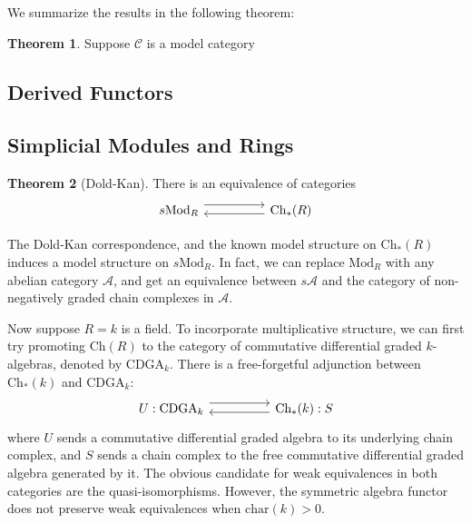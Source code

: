 \documentclass{article}
\theoremstyle{definition}
\newtheorem{theorem}{Theorem}[section]
\theoremstyle{definition}
\theoremstyle{definition}
\theoremstyle{definition}
\theoremstyle{definition}
\theoremstyle{definition}
\theoremstyle{definition}
\begin{document}
We summarize the results in the following theorem:
\begin{theorem}
	Suppose $\mathcal{C}$ is a model category
\end{theorem}

\subsection{Derived Functors}

\subsection{Simplicial Modules and Rings}

\begin{theorem}[Dold-Kan]
	There is an equivalence of categories 
	\[\begin{tikzcd}
		{s\textrm{Mod}_R} && {\textrm{Ch}_*(R)}
		\arrow[shift left=2, from=1-1, to=1-3]
		\arrow[shift left, from=1-3, to=1-1]
	\end{tikzcd}\]
\end{theorem}
The Dold-Kan correspondence, and the known model structure on $\textrm{Ch}_*(R)$ induces a model structure on $s\textrm{Mod}_R$. In fact, we can replace $\textrm{Mod}_R$ with any abelian category $\mathcal{A}$, and get an equivalence between $s\mathcal{A}$ and the category of non-negatively graded chain complexes in $\mathcal{A}$. 


Now suppose $R=k$ is a field. To incorporate multiplicative structure, we can first try promoting $\textrm{Ch}(R)$ to the category of commutative differential graded $k$-algebras, denoted by $\textrm{CDGA}_k$. There is a free-forgetful adjunction between $\textrm{Ch}_*(k)$ and $\textrm{CDGA}_k$:
\[\begin{tikzcd}
	{U:\textrm{CDGA}_k} && {\textrm{Ch}_*(k): S}
	\arrow[shift left=2, from=1-1, to=1-3]
	\arrow[shift left, from=1-3, to=1-1]
\end{tikzcd}\]
where $U$ sends a commutative differential graded algebra to its underlying chain complex, and $S$ sends a chain complex to the free commutative differential graded algebra generated by it. The obvious candidate for weak equivalences in both categories are the quasi-isomorphisms. However, the symmetric algebra functor does not preserve weak equivalences when $\textrm{char}(k)>0$.
\end{document}
